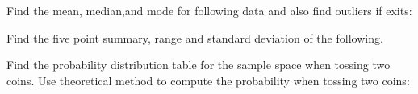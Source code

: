 \documentclass[11pt]{exam}
\begin{document}
\begin{questions}

\addpoints
\question[20] Find the mean, median,and mode for following data and also find outliers if exits: 
\vspace{9cm}

\newpage
\question[20] Find the five point summary, range and standard deviation of the following.
\newpage
\addpoints
\question[5] Find the probability distribution table for the sample space when tossing two coins.
\vspace{8cm}
\addpoints
\question[10] Use theoretical method to compute the probability when tossing two coins: 
\end{questions}
\end{document}
